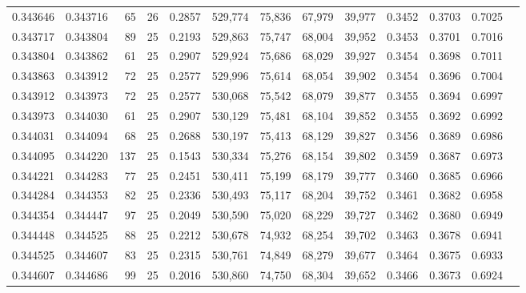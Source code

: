 \begin{tabular}{rrrrrrrrrrrrr}
0.343646 & 0.343716 &    65 &  26 &                                     0.2857 & 529,774 &  75,836 &  67,979 &  39,977 & 0.3452 & 0.3703 & 0.7025 \\
0.343717 & 0.343804 &    89 &  25 &                                     0.2193 & 529,863 &  75,747 &  68,004 &  39,952 & 0.3453 & 0.3701 & 0.7016 \\
0.343804 & 0.343862 &    61 &  25 &                                     0.2907 & 529,924 &  75,686 &  68,029 &  39,927 & 0.3454 & 0.3698 & 0.7011 \\
0.343863 & 0.343912 &    72 &  25 &                                     0.2577 & 529,996 &  75,614 &  68,054 &  39,902 & 0.3454 & 0.3696 & 0.7004 \\
0.343912 & 0.343973 &    72 &  25 &                                     0.2577 & 530,068 &  75,542 &  68,079 &  39,877 & 0.3455 & 0.3694 & 0.6997 \\
0.343973 & 0.344030 &    61 &  25 &                                     0.2907 & 530,129 &  75,481 &  68,104 &  39,852 & 0.3455 & 0.3692 & 0.6992 \\
0.344031 & 0.344094 &    68 &  25 &                                     0.2688 & 530,197 &  75,413 &  68,129 &  39,827 & 0.3456 & 0.3689 & 0.6986 \\
0.344095 & 0.344220 &   137 &  25 &                                     0.1543 & 530,334 &  75,276 &  68,154 &  39,802 & 0.3459 & 0.3687 & 0.6973 \\
0.344221 & 0.344283 &    77 &  25 &                                     0.2451 & 530,411 &  75,199 &  68,179 &  39,777 & 0.3460 & 0.3685 & 0.6966 \\
0.344284 & 0.344353 &    82 &  25 &                                     0.2336 & 530,493 &  75,117 &  68,204 &  39,752 & 0.3461 & 0.3682 & 0.6958 \\
0.344354 & 0.344447 &    97 &  25 &                                     0.2049 & 530,590 &  75,020 &  68,229 &  39,727 & 0.3462 & 0.3680 & 0.6949 \\
0.344448 & 0.344525 &    88 &  25 &                                     0.2212 & 530,678 &  74,932 &  68,254 &  39,702 & 0.3463 & 0.3678 & 0.6941 \\
0.344525 & 0.344607 &    83 &  25 &                                     0.2315 & 530,761 &  74,849 &  68,279 &  39,677 & 0.3464 & 0.3675 & 0.6933 \\
0.344607 & 0.344686 &    99 &  25 &                                     0.2016 & 530,860 &  74,750 &  68,304 &  39,652 & 0.3466 & 0.3673 & 0.6924 \\

\end{tabular}
